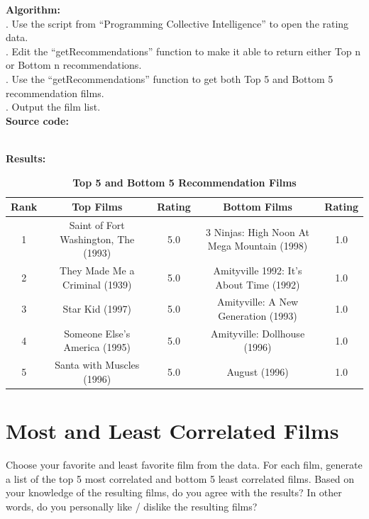 \documentclass{article}
\begin{document}
		\noindent\textbf{Algorithm:}\\
		. Use the script from ``Programming Collective Intelligence'' to open the rating data.\\
		. Edit the ``getRecommendations'' function to make it able to return either Top n or Bottom n recommendations.\\
		. Use the ``getRecommendations'' function to get both Top 5 and Bottom 5 recommendation films.\\
		. Output the film list.\\

		\noindent\textbf{Source code:}
		

		\noindent\\\textbf{Results:}
		\begin{table}[!htb]
			\centering
			\caption{\textbf{Top 5 and Bottom 5 Recommendation Films}}
			\begin{tabular}{ccccc}
				\toprule
				\textbf{Rank} & \textbf{Top Films} & \textbf{Rating} & \textbf{Bottom Films} & \textbf{Rating}\\
				\midrule
				1 & Saint of Fort Washington, The (1993) & 5.0 & 3 Ninjas: High Noon At Mega Mountain (1998) & 1.0\\
				2 & They Made Me a Criminal (1939) & 5.0 & Amityville 1992: It's About Time (1992) & 1.0\\
				3 & Star Kid (1997) & 5.0 & Amityville: A New Generation (1993) & 1.0\\
				4 & Someone Else's America (1995) & 5.0 & Amityville: Dollhouse (1996) & 1.0\\
				5 & Santa with Muscles (1996) & 5.0 & August (1996) & 1.0\\
				\bottomrule
			\end{tabular}
		\end{table}
		\section{Most and Least Correlated Films}
		Choose your favorite and least favorite film from the data. For each film, generate a list of the top 5 most correlated and bottom 5 least correlated films. Based on your knowledge of the resulting films, do you agree with the results? In other words, do you personally like / dislike the resulting films?\\
\end{document}
